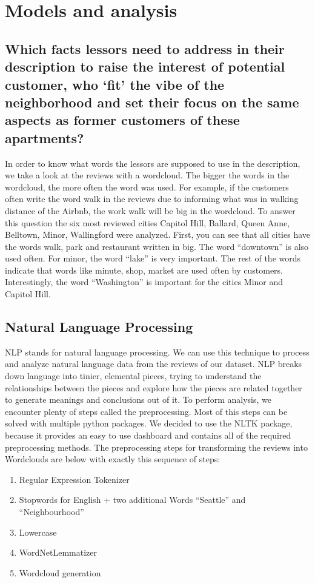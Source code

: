 \section{Models and analysis}
\subsection{Which facts lessors need to address in their description to raise the interest of potential customer, who ‘fit’ the vibe of the neighborhood and set their focus on the same aspects as former customers of these apartments?}
In order to know what words the lessors are supposed to use in the description, we take a look at the reviews with a wordcloud. The bigger the words in the wordcloud, the more often the word was used. For example, if the customers often write the word walk in the reviews due to informing what was in walking distance of the Airbnb, the work walk will be big in the wordcloud. 
To answer this question the six most reviewed cities Capitol Hill, Ballard, Queen Anne, Belltown, Minor, Wallingford were analyzed. First, you can see that all cities have the words walk, park and restaurant written in big. The word “downtown” is also used often. For minor, the word “lake” is very important. The rest of the words indicate that words like minute, shop, market are used often by customers. Interestingly, the word “Washington” is important for the cities Minor and Capitol Hill.

\subsection{Natural Language Processing}
NLP stands for natural language processing. We can use this technique to process and analyze natural language data from the reviews of our dataset. NLP breaks down language into tinier, elemental pieces, trying to understand the relationships between the pieces and explore how the pieces are related together to generate meanings and conclusions out of it. To perform analysis, we encounter plenty of steps called the preprocessing. Most of this steps can be solved with multiple python packages. We decided to use the NLTK package, because it provides an easy to use dashboard and contains all of the required preprocessing methods.
The preprocessing steps for transforming the reviews into Wordclouds are below with exactly this sequence of steps:
\begin{enumerate}
 \item Regular Expression Tokenizer
 \item Stopwords for English + two additional Words “Seattle” and “Neighbourhood”
 \item Lowercase
 \item WordNetLemmatizer
 \item Wordcloud generation
\end{enumerate}

